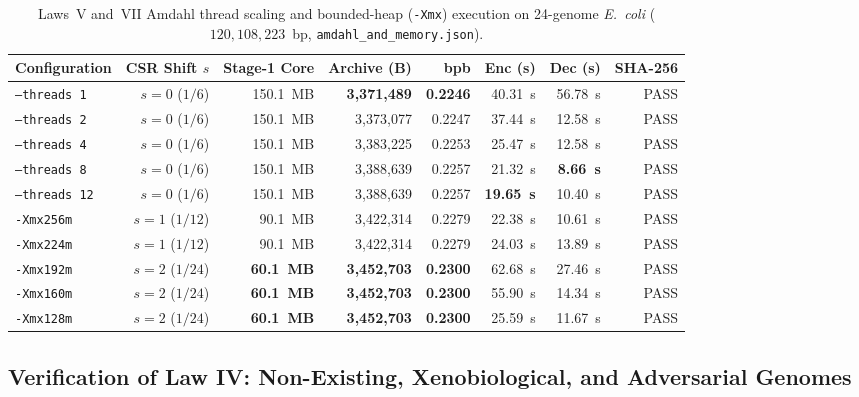 \documentclass[10pt]{article}
\theoremstyle{definition}
\begin{document}
\begin{table}[h!]
\centering
\caption{Laws~V and~VII Amdahl thread scaling and bounded-heap (\texttt{-Xmx}) execution on 24-genome \textit{E.~coli} ($120,108,223$~bp, \texttt{amdahl\_and\_memory.json}).}
\label{tab:amdahl_mem}
\small
\begin{tabular}{lrrrrrrr}
\toprule
\textbf{Configuration} & \textbf{CSR Shift $s$} & \textbf{Stage-1 Core} & \textbf{Archive (B)} & \textbf{bpb} & \textbf{Enc (s)} & \textbf{Dec (s)} & \textbf{SHA-256} \\
\midrule
\texttt{--threads 1} & $s=0$ ($1/6$) & 150.1~MB & \textbf{3,371,489} & \textbf{0.2246} & 40.31~s & 56.78~s & PASS \\
\texttt{--threads 2} & $s=0$ ($1/6$) & 150.1~MB & 3,373,077 & 0.2247 & 37.44~s & 12.58~s & PASS \\
\texttt{--threads 4} & $s=0$ ($1/6$) & 150.1~MB & 3,383,225 & 0.2253 & 25.47~s & 12.58~s & PASS \\
\texttt{--threads 8} & $s=0$ ($1/6$) & 150.1~MB & 3,388,639 & 0.2257 & 21.32~s & \textbf{8.66~s} & PASS \\
\texttt{--threads 12} & $s=0$ ($1/6$) & 150.1~MB & 3,388,639 & 0.2257 & \textbf{19.65~s} & 10.40~s & PASS \\
\midrule
\texttt{-Xmx256m} & $s=1$ ($1/12$) & 90.1~MB & 3,422,314 & 0.2279 & 22.38~s & 10.61~s & PASS \\
\texttt{-Xmx224m} & $s=1$ ($1/12$) & 90.1~MB & 3,422,314 & 0.2279 & 24.03~s & 13.89~s & PASS \\
\texttt{-Xmx192m} & $s=2$ ($1/24$) & \textbf{60.1~MB} & \textbf{3,452,703} & \textbf{0.2300} & 62.68~s & 27.46~s & PASS \\
\texttt{-Xmx160m} & $s=2$ ($1/24$) & \textbf{60.1~MB} & \textbf{3,452,703} & \textbf{0.2300} & 55.90~s & 14.34~s & PASS \\
\texttt{-Xmx128m} & $s=2$ ($1/24$) & \textbf{60.1~MB} & \textbf{3,452,703} & \textbf{0.2300} & 25.59~s & 11.67~s & PASS \\
\bottomrule
\end{tabular}
\end{table}

\subsection{Verification of Law IV: Non-Existing, Xenobiological, and Adversarial Genomes}
\end{document}
